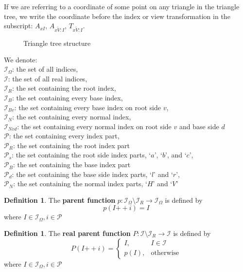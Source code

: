 \documentclass[a4paper,12pt]{article}
\newcommand\doubleplus{\mathbin{+\!+}}
\newcommand{\HSview}[1][V]{\widetilde{#1}}
\newcommand{\HSAx}[1][I]{A_{x\HSview:#1}}
\newcommand{\HSTx}[1][I]{T_{x\HSview:#1}}
\theoremstyle{definition}
\newtheorem{definition}[theorem]{Definition}
\theoremstyle{plain}
\begin{document}
	If we are referring to a coordinate of some point on any triangle in the triangle tree, we write the
	coordinate before the index or view transformation in the subscript: $A_{xI}$, $\HSAx$, $\HSTx$.
	
	\begin{figure}[h]
		\centering
		\def\svgwidth{\columnwidth}
		\scalebox{0.65}{}
		\caption{Triangle tree structure}
	\end{figure}
	
	We denote:\\
	$\mathcal{I}_\Omega$: the set of all indices,\\
	$\mathcal{I}$: the set of all real indices,\\
	$\mathcal{I}_R$: the set containing the root index,\\
	$\mathcal{I}_{B}$: the set containing every base index,\\
	$\mathcal{I}_{Bv}$: the set containing every base index on root side $v$,\\
	$\mathcal{I}_{N}$: the set containing every normal index,\\
	$\mathcal{I}_{Nvd}$: the set containing every normal index on root side $v$ and base side $d$\\
	$\mathcal{P}$: the set containing every index part,\\
	$\mathcal{P}_{R}$: the set containing the root index part\\
	$\mathcal{P}_{s}$: the set containing the root side index parts, `$a$', `$b$', and `$c$',\\
	$\mathcal{P}_{B}$: the set containing the base index part\\
	$\mathcal{P}_{d}$: the set containing the base side index parts, `$l$' and `$r$',\\
	$\mathcal{P}_{N}$: the set containing the normal index parts, `$H$' and `$V$'
	
	\begin{definition}
		The \textbf{parent function} $p : \mathcal{I}_\Omega \setminus \mathcal{I}_R \to \mathcal{I}_\Omega$ is defined by
		$$p(I \doubleplus i) = I$$
		where $I \in \mathcal{I}_\Omega, i \in \mathcal{P}$
	\end{definition}
	
	\begin{definition}
		The \textbf{real parent function} $P : \mathcal{I} \setminus \mathcal{I}_R \to \mathcal{I}$ is defined by
		$$P(I \doubleplus i) = \begin{cases}
			I, & I \in \mathcal{I}\\
			p(I), & \text{otherwise}
  	\end{cases}$$
		where $I \in \mathcal{I}_\Omega, i \in \mathcal{P}$
	\end{definition}
	
\end{document}
